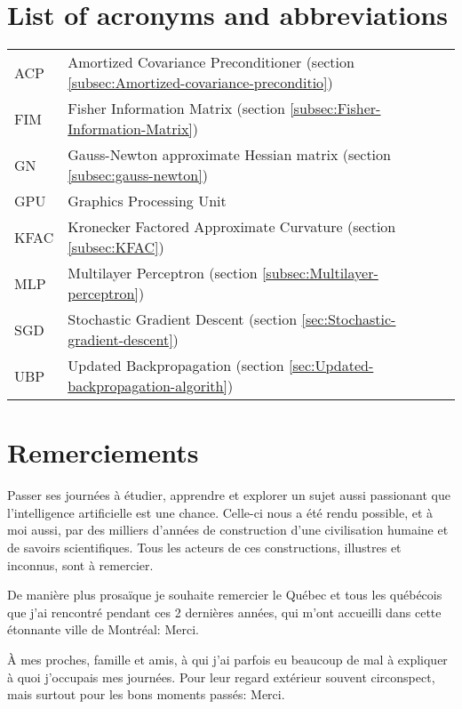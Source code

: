 \documentclass[12pt,maitrise,nobabel,anglais,twoside,initial]{template/dms}
\numberwithin{equation}{section}
\numberwithin{table}{chapter}
\numberwithin{figure}{chapter}
\begin{document}
\chapter*{List of acronyms and abbreviations}
\begingroup %
\renewcommand{\arraystretch}{2} 
\noindent\begin{tabular}{p{} p{}}
  ACP & Amortized Covariance Preconditioner (section \ref{subsec:Amortized-covariance-preconditio})\\
  FIM & Fisher Information Matrix (section \ref{subsec:Fisher-Information-Matrix})\\
  GN  &  Gauss-Newton approximate Hessian matrix (section \ref{subsec:gauss-newton})\\
  GPU & Graphics Processing Unit\\
  KFAC & Kronecker Factored Approximate Curvature (section \ref{subsec:KFAC})\\
  MLP  & Multilayer Perceptron (section \ref{subsec:Multilayer-perceptron}) \\
  SGD  &  Stochastic Gradient Descent (section \ref{sec:Stochastic-gradient-descent})\\
  UBP & Updated Backpropagation (section \ref{sec:Updated-backpropagation-algorith})\\

\end{tabular}
     \endgroup  %


\chapter*{Remerciements} %

Passer ses journées à étudier, apprendre et explorer un sujet aussi passionant que l'intelligence artificielle est une chance. Celle-ci nous a été rendu possible, et à moi aussi, par des milliers d'années de construction d'une civilisation humaine et de savoirs scientifiques. Tous les acteurs de ces constructions, illustres et inconnus, sont à remercier. 

De manière plus prosaïque je souhaite remercier le Québec et tous les québécois que j'ai rencontré pendant ces 2 dernières années, qui m'ont accueilli dans cette étonnante ville de Montréal: Merci. 

À mes proches, famille et amis, à qui j'ai parfois eu beaucoup de mal à expliquer à quoi j'occupais mes journées. Pour leur regard extérieur souvent circonspect, mais surtout pour les bons moments passés: Merci.
\end{document}
